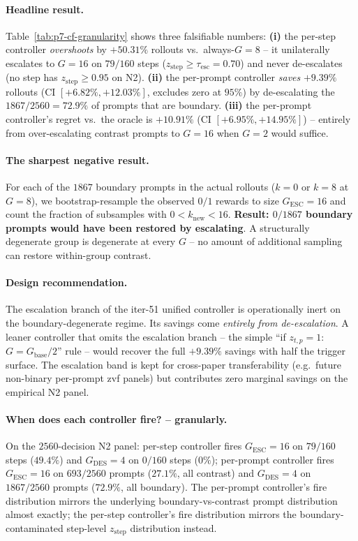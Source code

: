 \paragraph{Headline result.}
Table~\ref{tab:p7-cf-granularity} shows three falsifiable numbers:
\textbf{(i)} the per-step controller \emph{overshoots} by
$+50.31\%$ rollouts vs.\ always-$G{=}8$ -- it unilaterally
escalates to $G{=}16$ on $79/160$ steps ($z_{\mathrm{step}} \geq
\tau_{\mathrm{esc}}{=}0.70$) and never de-escalates (no step has
$z_{\mathrm{step}} \geq 0.95$ on N2). \textbf{(ii)} the per-prompt
controller \emph{saves} $+9.39\%$ rollouts
(CI $[+6.82\%, +12.03\%]$, excludes zero at $95\%$) by
de-escalating the $1867/2560 = 72.9\%$ of prompts that are boundary.
\textbf{(iii)} the per-prompt controller's regret vs.\ the oracle
is $+10.91\%$ (CI $[+6.95\%, +14.95\%]$) -- entirely from
over-escalating contrast prompts to $G{=}16$ when $G{=}2$ would
suffice.

\paragraph{The sharpest negative result.}
For each of the $1867$ boundary prompts in the actual rollouts
($k{=}0$ or $k{=}8$ at $G{=}8$), we bootstrap-resample the
observed $0/1$ rewards to size $G_{\mathrm{ESC}}{=}16$ and count
the fraction of subsamples with $0 < k_{\mathrm{new}} < 16$.
\textbf{Result: $0/1867$ boundary prompts would have been restored
by escalating}. A structurally degenerate group is degenerate at
every $G$ -- no amount of additional sampling can restore
within-group contrast.

\paragraph{Design recommendation.}
The escalation branch of the iter-51 unified controller is
operationally inert on the boundary-degenerate regime. Its savings
come \emph{entirely from de-escalation}. A leaner controller that
omits the escalation branch -- the simple
``if $z_{t,p}=1$: $G = G_{\mathrm{base}}/2$'' rule -- would
recover the full $+9.39\%$ savings with half the trigger surface.
The escalation band is kept for cross-paper transferability
(e.g.\ future non-binary per-prompt zvf panels) but contributes
zero marginal savings on the empirical N2 panel.

\paragraph{When does each controller fire? -- granularly.}
On the $2560$-decision N2 panel: per-step controller fires
$G_{\mathrm{ESC}}{=}16$ on $79/160$ steps ($49.4\%$) and
$G_{\mathrm{DES}}{=}4$ on $0/160$ steps ($0\%$); per-prompt
controller fires $G_{\mathrm{ESC}}{=}16$ on $693/2560$ prompts
($27.1\%$, all contrast) and $G_{\mathrm{DES}}{=}4$ on
$1867/2560$ prompts ($72.9\%$, all boundary). The per-prompt
controller's fire distribution mirrors the underlying
boundary-vs-contrast prompt distribution almost exactly; the
per-step controller's fire distribution mirrors the
boundary-contaminated step-level $z_{\mathrm{step}}$ distribution
instead.

